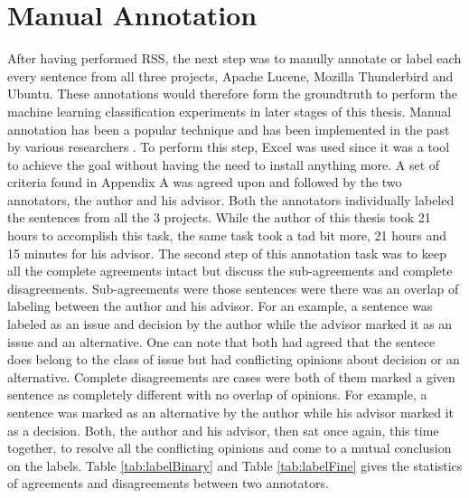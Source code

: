 \documentclass[a4paper,12pt,twoside]{report}
\begin{document}
\section{Manual Annotation}
After having performed RSS, the next step was to manully annotate or label each every sentence from all three projects, Apache Lucene, Mozilla Thunderbird and Ubuntu. These annotations would therefore form the groundtruth to perform the machine learning classification experiments in later stages of this thesis. Manual annotation has been a popular technique and has been implemented in the past by various researchers \cite{Alkadhi2017} \cite{Nonnenmacher2017}. 
\newline \newline 
To perform this step, Excel was used since it was a tool to achieve the goal without having the need to install anything more. A set of criteria found in Appendix A was agreed upon and followed by the two annotators, the author and his advisor. Both the annotators individually labeled the sentences from all the 3 projects. While the author of this thesis took 21 hours to accomplish this task, the same task took a tad bit more, 21 hours and 15 minutes for his advisor. 
\newline \newline 
The second step of this annotation task was to keep all the complete agreements intact but discuss the sub-agreements and complete disagreements. Sub-agreements were those sentences were there was an overlap of labeling between the author and his advisor. For an example, a sentence was labeled as an issue and decision by the author while the advisor marked it as an issue and an alternative. One can note that both had agreed that the sentece does belong to the class of issue but had conflicting opinions about decision or an alternative. Complete disagreements are cases were both of them marked a given sentence as completely different with no overlap of opinions. For example, a sentence was marked as an alternative by the author while his advisor marked it as a decision. Both, the author and his advisor, then sat once again, this time together, to resolve all the conflicting opinions and come to a mutual conclusion on the labels. Table \ref{tab:labelBinary} and Table \ref{tab:labelFine} gives the statistics of agreements and disagreements between two annotators. 
\end{document}
